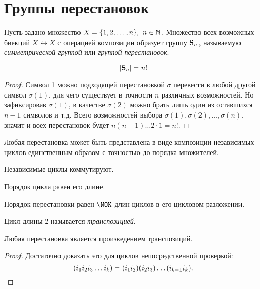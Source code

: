 \newpage
	\section{Группы перестановок}
	\setcounter{definition}{0}
	\begin{definition}
		Пусть задано множество ${X = \{1, 2, \ldots, n\}, \ n \in \mathbb{N}}$. Множество всех возможных биекций ${X \leftrightarrow X}$ с операцией композиции образует группу $\mathbf{S}_n$, называемую \textit{симметрической группой} или \textit{группой перестановок}.
	\end{definition}
	\begin{statement}
		\begin{equation*}
			|\mathbf{S}_n| = n!
		\end{equation*}
	\end{statement}
	\begin{proof}
		Символ 1 можно подходящей перестановкой $\sigma$ перевести в любой другой символ ${\sigma(1)}$, для чего существует в точности $n$ различных возможностей. Но зафиксировав ${\sigma(1)}$, в качестве ${\sigma(2)}$ можно брать лишь один из оставшихся ${n - 1}$ символов и т.д. Всего возможностей выбора ${\sigma(1), \sigma(2), \ldots, \sigma(n)}$, значит и всех перестановок будет ${n(n - 1) \ldots 2 \cdot 1 = n!.}$
	\end{proof}
	\begin{statement}
		Любая перестановка может быть представлена в виде композиции независимых циклов единственным образом с точностью до порядка множителей.
	\end{statement}
	\begin{statement}
		Независимые циклы коммутируют.
	\end{statement}
        \begin{statement}
		Порядок цикла равен его длине.
	\end{statement}
	\begin{statement}
		Порядок перестановки равен $\NOK$ длин циклов в его цикловом разложении.
	\end{statement}
        \begin{definition}
		Цикл длины 2 называется \textit{транспозицией}.
	\end{definition}
	\begin{lemma}
		Любая перестановка является произведением транспозиций.
	\end{lemma}
        \begin{proof}
            Достаточно доказать это для циклов непосредственной проверкой:
            \begin{equation*}
                (i_1 i_2 i_3 \ldots i_k) = (i_1 i_2)(i_2 i_3)\ldots(i_{k-1} i_k). \qedhere
            \end{equation*}
        \end{proof}
